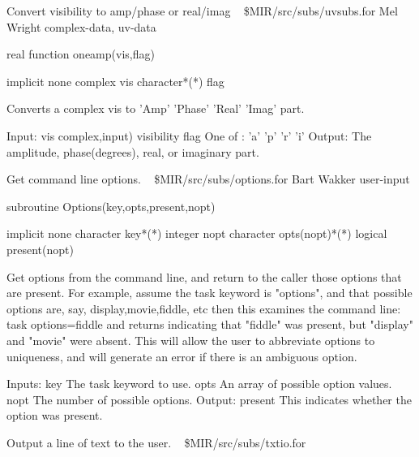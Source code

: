 %
\noindent Convert visibility to amp/phase or real/imag
\newline \ 
\newline {} \$MIR/src/subs/uvsubs.for
\newline {} Mel Wright
\newline {} complex-data, uv-data
\par{\tenpoint
{\eightpoint\begintt
        real function oneamp(vis,flag)

        implicit none
        complex vis
        character*(*) flag

  Converts a complex vis to 'Amp' 'Phase' 'Real' 'Imag' part.

  Input:
    vis        complex,input)   visibility
    flag       One of : 'a' 'p' 'r' 'i'
  Output:
               The amplitude, phase(degrees), real, or imaginary part.
\endtt}
\par}
%
\noindent Get command line options.
\newline \ 
\newline {} \$MIR/src/subs/options.for
\newline {} Bart Wakker
\newline \abox{Keywords:} user-input
\par{\tenpoint
{\eightpoint\begintt
        subroutine Options(key,opts,present,nopt)

        implicit none
        character key*(*)
        integer nopt
        character opts(nopt)*(*)
        logical present(nopt)

  Get options from the command line, and return to the caller those
  options that are present. For example, assume the task keyword is
  "options", and that possible options are, say, display,movie,fiddle, etc
  then this examines the command line:
    task options=fiddle
  and returns indicating that "fiddle" was present, but "display" and
  "movie" were absent.
  This will allow the user to abbreviate options to uniqueness, and will
  generate an error if there is an ambiguous option.

  Inputs:
    key        The task keyword to use.
    opts       An array of possible option values.
    nopt       The number of possible options.
  Output:
    present    This indicates whether the option was present.
\endtt}
\par}
%
\noindent Output a line of text to the user.
\newline \ 
\newline {} \$MIR/src/subs/txtio.for
